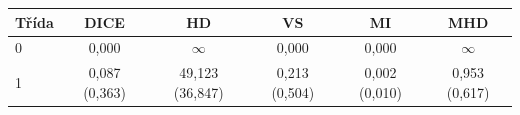 \begin{tabular}{l c c c c c}
 \hline
Třída & DICE & HD & VS & MI & MHD \\ \hline
0 & 0,000 & $\infty$ & 0,000 & 0,000 & $\infty$ \\
1 & 0,087 (0,363) & 49,123 (36,847) & 0,213 (0,504) & 0,002 (0,010) & 0,953 (0,617) \\
\hline 
 \end{tabular}
